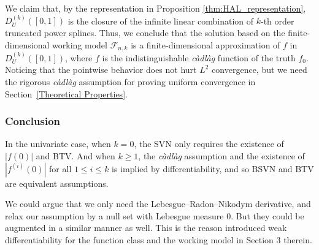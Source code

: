 We claim that, by the representation in Proposition \ref{thm:HAL_representation}, $D^{(k)}_U([0,1])$ is the closure of the infinite linear combination of $k$-th order truncated power splines. Thus, we conclude that the solution based on the finite-dimensional working model $\mathcal{F}_{n,k}$ is a finite-dimensional approximation of $f$ in $D^{(k)}_U([0,1])$, where $f$ is the indistinguishable \emph{c\`adl\`ag} function of the truth $f_0$. Noticing that the pointwise behavior does not hurt $L^2$ convergence, but we need the rigorous \emph{c\`adl\`ag} assumption for proving uniform convergence in Section~\ref{Theoretical Properties}.

\subsubsection{Conclusion}
In the univariate case, when $k = 0$, the SVN only requires the existence of $|f(0)|$ and BTV. And when $k \ge 1$, the \emph{c\`adl\`ag} assumption and the existence of $|f^{(i)}(0)|$ for all $1 \le i \le k$ is implied by differentiability, and so BSVN and BTV are equivalent assumptions.

\begin{remark} We could argue that we only need the Lebesgue–Radon–Nikodym derivative, and relax our assumption by a null set with Lebesgue measure 0. But they could be augmented in a similar manner as well. This is the reason \citet{tibshirani2014adaptive} introduced weak differentiability for the function class and the working model in Section 3 therein. 
\end{remark}



